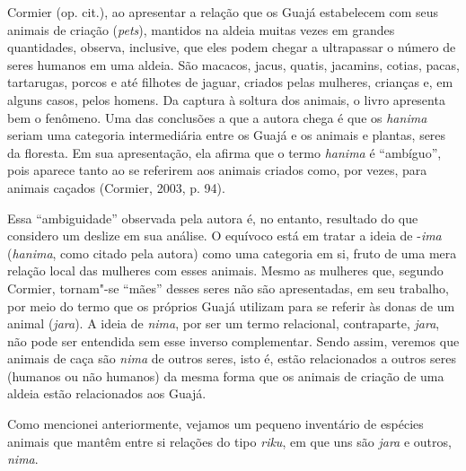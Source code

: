 Cormier (op. cit.), ao apresentar a relação que os Guajá estabelecem com
seus animais de criação (\emph{pets}), mantidos na aldeia muitas vezes
em grandes quantidades, observa, inclusive, que eles podem chegar a
ultrapassar o número de seres humanos em uma aldeia. São macacos, jacus,
quatis, jacamins, cotias, pacas, tartarugas, porcos e até filhotes de
jaguar, criados pelas mulheres, crianças e, em alguns casos, pelos
homens. Da captura à soltura dos animais, o livro apresenta bem o
fenômeno. Uma das conclusões a que a autora chega é que os \emph{hanima}
seriam uma categoria intermediária entre os Guajá e os animais e
plantas, seres da floresta. Em sua apresentação, ela afirma que o termo
\emph{hanima} é ``ambíguo'', pois aparece tanto ao se referirem aos
animais criados como, por vezes, para animais caçados (Cormier, 2003, p.
94).

Essa ``ambiguidade'' observada pela autora é, no entanto, resultado do que
considero um deslize em sua análise. O equívoco está em tratar a ideia
de -\emph{ima} (\emph{hanima}, como citado pela autora) como uma
categoria em si, fruto de uma mera relação local das mulheres com esses
animais. Mesmo as mulheres que, segundo Cormier, tornam"-se ``mães'' desses
seres não são apresentadas, em seu trabalho, por meio do termo que os
próprios Guajá utilizam para se referir às donas de um animal
(\emph{jara}). A ideia de \emph{nima}, por ser um termo relacional,
contraparte, \emph{jara}, não pode ser entendida sem esse inverso
complementar. Sendo assim, veremos que animais de caça são \emph{nima}
de outros seres, isto é, estão relacionados a outros seres (humanos ou
não humanos) da mesma forma que os animais de criação de uma aldeia
estão relacionados aos Guajá.

Como mencionei anteriormente, vejamos um pequeno inventário de espécies
animais que mantêm entre si relações do tipo \emph{riku}, em que uns são
\emph{jara} e outros, \emph{nima}.

